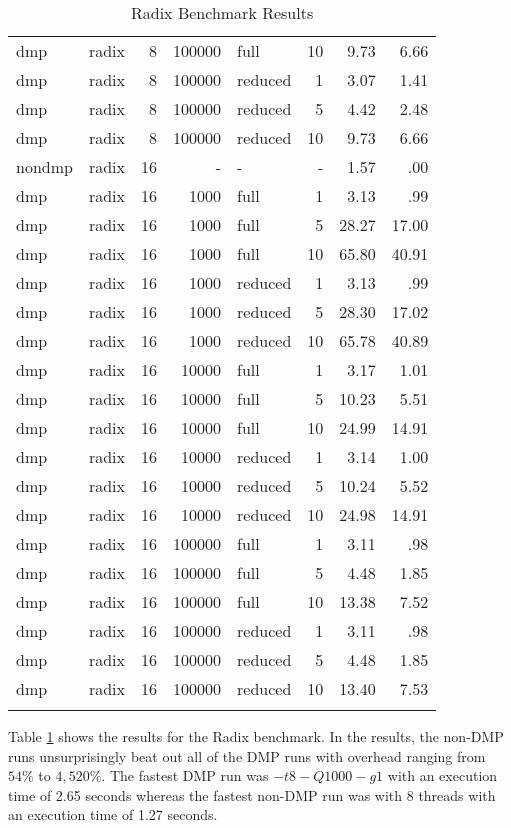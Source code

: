\begin{center}
\begin{small}
\begin{longtable}{llrrlrrr}
dmp & radix & 8 & 100000 & full & 10 & 9.73 & 6.66\\
dmp & radix & 8 & 100000 & reduced & 1 & 3.07 & 1.41\\
dmp & radix & 8 & 100000 & reduced & 5 & 4.42 & 2.48\\
dmp & radix & 8 & 100000 & reduced & 10 & 9.73 & 6.66\\
\hline
nondmp & radix & 16 & - & - & - & 1.57 & .00\\
dmp & radix & 16 & 1000 & full & 1 & 3.13 & .99\\
dmp & radix & 16 & 1000 & full & 5 & 28.27 & 17.00\\
dmp & radix & 16 & 1000 & full & 10 & 65.80 & 40.91\\
dmp & radix & 16 & 1000 & reduced & 1 & 3.13 & .99\\
dmp & radix & 16 & 1000 & reduced & 5 & 28.30 & 17.02\\
dmp & radix & 16 & 1000 & reduced & 10 & 65.78 & 40.89\\
dmp & radix & 16 & 10000 & full & 1 & 3.17 & 1.01\\
dmp & radix & 16 & 10000 & full & 5 & 10.23 & 5.51\\
dmp & radix & 16 & 10000 & full & 10 & 24.99 & 14.91\\
dmp & radix & 16 & 10000 & reduced & 1 & 3.14 & 1.00\\
dmp & radix & 16 & 10000 & reduced & 5 & 10.24 & 5.52\\
dmp & radix & 16 & 10000 & reduced & 10 & 24.98 & 14.91\\
dmp & radix & 16 & 100000 & full & 1 & 3.11 & .98\\
dmp & radix & 16 & 100000 & full & 5 & 4.48 & 1.85\\
dmp & radix & 16 & 100000 & full & 10 & 13.38 & 7.52\\
dmp & radix & 16 & 100000 & reduced & 1 & 3.11 & .98\\
dmp & radix & 16 & 100000 & reduced & 5 & 4.48 & 1.85\\
dmp & radix & 16 & 100000 & reduced & 10 & 13.40 & 7.53\\
\hline
\caption{Radix Benchmark Results}
\label{tab:radix_results}
\end{longtable}
\end{small}
\end{center}

Table \ref{tab:radix_results} shows the results for the Radix
benchmark.  In the results, the non-DMP runs unsurprisingly beat out
all of the DMP runs with overhead ranging from $54\%$ to $4,520\%$.
The fastest DMP run was $-t8 -Q1000 -g1$ with an execution time of
2.65 seconds whereas the fastest non-DMP run was with 8 threads with
an execution time of 1.27 seconds.

